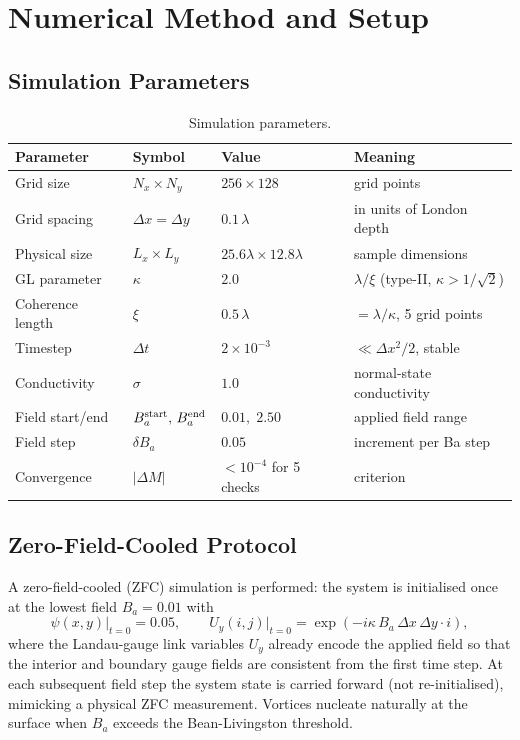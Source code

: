 \documentclass[11pt,a4paper]{article}
\newcommand{\kGL}{\kappa}
\newcommand{\Ba}{B_a}
\newcommand{\lam}{\lambda}
\begin{document}
\section{Numerical Method and Setup}

\subsection{Simulation Parameters}

\begin{table}[h!]
\centering
\caption{Simulation parameters.}
\label{tab:params}
\begin{tabular}{llll}
\toprule
Parameter & Symbol & Value & Meaning \\
\midrule
Grid size       & $N_x \times N_y$ & $256 \times 128$ & grid points \\
Grid spacing    & $\Delta x = \Delta y$ & $0.1\,\lam$ & in units of London depth \\
Physical size   & $L_x \times L_y$ & $25.6\lam \times 12.8\lam$ & sample dimensions \\
GL parameter    & $\kGL$ & $2.0$ & $\lambda/\xi$ (type-II, $\kGL>1/\sqrt{2}$) \\
Coherence length & $\xi$ & $0.5\,\lam$ & $= \lam/\kGL$, 5 grid points \\
Timestep        & $\Delta t$ & $2\times10^{-3}$ & $\ll \Delta x^2/2$, stable \\
Conductivity    & $\sigma$ & $1.0$ & normal-state conductivity \\
\midrule
Field start/end & $\Ba^{\rm start},\, \Ba^{\rm end}$ & $0.01,\; 2.50$ & applied field range \\
Field step      & $\delta\Ba$ & $0.05$ & increment per Ba step \\
Convergence     & $|\Delta M|$ & $< 10^{-4}$ for 5 checks & criterion \\
\bottomrule
\end{tabular}
\end{table}

\subsection{Zero-Field-Cooled Protocol}

A zero-field-cooled (ZFC) simulation is performed: the system is initialised
once at the lowest field $\Ba = 0.01$ with
%
\begin{equation}
  \psi(x,y)\big|_{t=0} = 0.05, \qquad
  U_y(i,j)\big|_{t=0} = \exp(-i\kGL\,\Ba\,\Delta x\,\Delta y\cdot i),
  \label{eq:zfc_init}
\end{equation}
%
where the Landau-gauge link variables $U_y$ already encode the applied field
so that the interior and boundary gauge fields are consistent from the first
time step.  At each subsequent field step the system state is carried forward
(not re-initialised), mimicking a physical ZFC measurement.  Vortices
nucleate naturally at the surface when $\Ba$ exceeds the Bean-Livingston
threshold.
\end{document}
